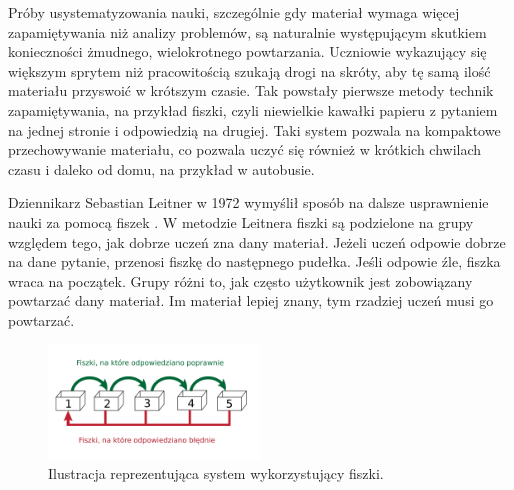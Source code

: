 \documentclass[a4paper,twoside,12pt]{book}
\begin{document}




Próby usystematyzowania nauki, szczególnie gdy materiał wymaga więcej zapamiętywania niż analizy problemów, są naturalnie występującym skutkiem konieczności żmudnego, wielokrotnego powtarzania. Uczniowie wykazujący się większym sprytem niż pracowitością szukają drogi na skróty, aby tę samą ilość materiału przyswoić w krótszym czasie. Tak powstały pierwsze metody technik zapamiętywania, na przykład fiszki, czyli niewielkie kawałki papieru z pytaniem na jednej stronie i odpowiedzią na drugiej. Taki system pozwala na kompaktowe przechowywanie materiału, co pozwala uczyć się również w krótkich chwilach czasu i daleko od domu, na przykład w autobusie. 

Dziennikarz Sebastian Leitner w 1972 wymyślił sposób na dalsze usprawnienie nauki za pomocą fiszek \cite{bib:internetLeitner}. W metodzie Leitnera fiszki są podzielone na grupy względem tego, jak dobrze uczeń zna dany materiał. Jeżeli uczeń odpowie dobrze na dane pytanie, przenosi fiszkę do następnego pudełka. Jeśli odpowie źle, fiszka wraca na początek. Grupy różni to, jak często użytkownik jest zobowiązany powtarzać dany materiał. Im materiał lepiej znany, tym rzadziej uczeń musi go powtarzać. 

\begin{figure}
\centering
\includegraphics[width=0.5\textwidth]{leitner_system}
\caption{Ilustracja reprezentująca system wykorzystujący fiszki.}
\label{fig:etykieta-rysunku1}
\end{figure}
\end{document}
